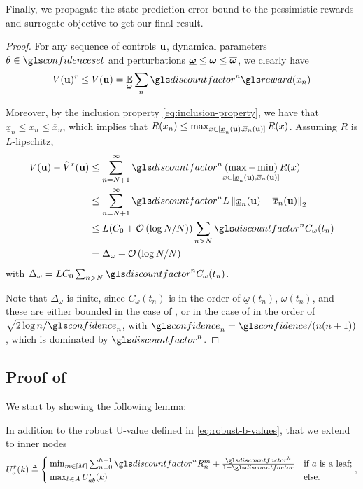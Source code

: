\begin{subappendices}
	
	Finally, we propagate the state prediction error bound to the pessimistic rewards and surrogate objective to get our final result.
	\begin{proof}
		For any sequence of controls $\mathbf{u}$, dynamical parameters $\theta\in \confidenceset$ and perturbations $\underline{\bm{\omega}} \leq \bm{\omega} \leq \overline{\bm{\omega}}$, we clearly have 
		\[V(\bu)^r \leq V(\bu) = \expectedvalue_{\bom}\sum_n \discount^n \R(x_n)\]
		
		Moreover, by the inclusion property \eqref{eq:inclusion-property}, we have that $\underline{x}_n \leq x_n \leq \overline{x}_n$, which implies that $R(x_n) \leq \max_{x\in[\underline{x}_n(\mathbf{u}), \overline{x}_n(\mathbf{u})]}  R(x)$. Assuming $R$ is $L$-lipschitz,
		\begin{align*}
		V(\bu) - \hat{V}^r(\bu) &\leq \sum_{n=N+1}^\infty \discount^n \underset{{x\in[\underline{x}_n(\bu), \overline{x}_n(\bu)]}}{(\max - \min)} R(x)\\
		&\leq \sum_{n=N+1}^\infty \discount^n L \left\|\underline{x}_n(\bu) - \overline{x}_n(\bu)\right\|_2\\
		&\leq L(C_0 + \cO\left({\log N / N}\right)) \sum_{n>N} \discount^n C_{\omega}(t_n)\\
		&= \Delta_\omega + \cO\left({\log N / N}\right)
		\end{align*}
		with $\Delta_\omega = L C_0\sum_{n>N} \discount^n C_{\omega}(t_n)$.
		
		Note that $\Delta_\omega$ is finite, since $C_{\omega}(t_n)$ is in the order of $\underline{\omega}(t_n)$, $\overline{\omega}(t_n)$, and these are either bounded in the case of , or in the case of  in the order of $\sqrt{2\log n / \confidence_n}$, with $\confidence_n = \confidence/(n(n+1))$, which is dominated by $\discount^n$.
	\end{proof}
	
	
	\subsection{Proof of }
	
	We start by showing the following lemma:
	
	
	\begin{lemma}
		\label{lemma:uvb}
		\begin{leftbar}[lemmabar]
		In addition to the robust U-value defined in \eqref{eq:robust-b-values}, that we extend to inner nodes	
		\begin{equation}
		\label{eq:br}
		U_a^r(k)  \eqdef
		\begin{cases}
		\min_{m\in[M]} \sum_{n=0}^{h-1} \discount^n R_n^m  + \frac{\discount^h}{1-\discount}&\text{if } a \text{ is a leaf;}\\
		\max_{b\in\mathcal{A}} U_{ab}^r(k) & \text{else.}
		\end{cases},
		\end{equation}
		

\end{leftbar}
\end{lemma}
\end{subappendices}

